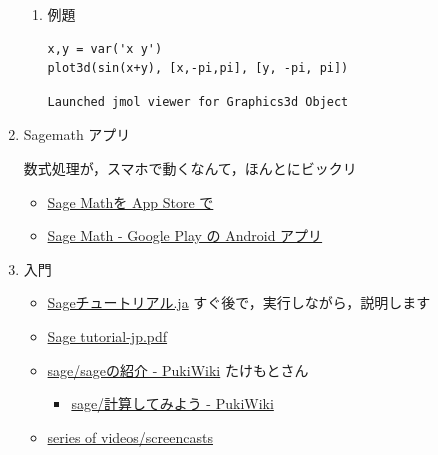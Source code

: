 \documentclass[dvipdfmx,11pat]{jarticle}
\begin{document}
\begin{enumerate}
\begin{enumerate}
\item 例題
\label{sec:orgfc665bd}
\begin{verbatim}
x,y = var('x y')
plot3d(sin(x+y), [x,-pi,pi], [y, -pi, pi])
\end{verbatim}

\begin{verbatim}
Launched jmol viewer for Graphics3d Object
\end{verbatim}
\end{enumerate}


\item Sagemath アプリ
\label{sec:org7193175}

数式処理が，スマホで動くなんて，ほんとにビックリ

\begin{itemize}
\item \href{https://itunes.apple.com/jp/app/sage-math/id496492945?mt=8}{Sage Mathを App Store で}

\item \href{https://play.google.com/store/apps/details?id=org.sagemath.droid\&hl=ja}{Sage Math - Google Play の Android アプリ}
\end{itemize}

\item 入門
\label{sec:org5684bc5}

\begin{itemize}
\item \href{http://doc.sagemath.org/html/ja/tutorial/index.html}{Sageチュートリアル.ja} すぐ後で，実行しながら，説明します

\item \href{http://doc.sagemath.org/pdf/ja/tutorial/tutorial-jp.pdf}{Sage tutorial-jp.pdf}

\item \href{http://www.pwv.co.jp/\%7Etake/TakeWiki/index.php?sage\%2Fsage\%E3\%81\%AE\%E7\%B4\%B9\%E4\%BB\%8B}{sage/sageの紹介 - PukiWiki} たけもとさん

\begin{itemize}
\item \href{http://www.pwv.co.jp/\~take/TakeWiki/index.php?sage\%2F\%E8\%A8\%88\%E7\%AE\%97\%E3\%81\%97\%E3\%81\%A6\%E3\%81\%BF\%E3\%82\%88\%E3\%81\%86}{sage/計算してみよう - PukiWiki}
\end{itemize}

\item \href{http://www.sagemath.org/help-video.html}{series of videos/screencasts}
\end{itemize}


\end{enumerate}
\end{document}
